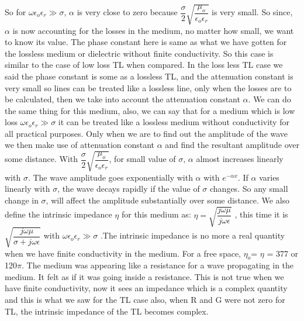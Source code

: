 So for $\omega\epsilon_{o}\epsilon_{r} \gg \sigma$, $\alpha$ is very close to zero because $\dfrac{\sigma}{2}\sqrt{\dfrac{\mu_{o}}{\epsilon_{o}\epsilon_{r}}}$ is very small. So since, $\alpha$ is now accounting for the losses in the medium, no matter how small, we want to know its value. The phase constant here is same as what we have gotten for the lossless medium or dielectric without finite conductivity. So this case is similar to the case of low loss TL when compared.
In the loss less TL case we said the phase constant is some as a lossless TL, and the attenuation constant is very small so lines can be treated like a lossless line, only when the losses are to be calculated, then we take into account the attenuation constant $\alpha$. We can do the same thing for this medium, also, we can say that for a medium which is low loss $\omega\epsilon_{o}\epsilon_{r} \gg \sigma$ it can be treated like a lossless medium without conductivity for all practical purposes. Only when we are to find out the amplitude of the wave we then make use of attenuation constant $\alpha$ and find the resultant amplitude over some distance. With $\dfrac{\sigma}{2}\sqrt{\dfrac{\mu_{o}}{\epsilon_{o}\epsilon_{r}}}$, for small value of $\sigma$, $\alpha$ almost increases linearly with $\sigma$. The wave amplitude goes exponentially with $\alpha$ with $e^{-\alpha x}$. If $\alpha$ varies linearly with $\sigma$, the wave decays rapidly if the value of $\sigma$ changes. So any small change in $\sigma$, will affect the amplitude substantially over some distance. 
We also define the intrinsic impedance $\eta$ for this medium as:
$\eta= \sqrt{\dfrac{j\omega\mu}{j\omega\epsilon}}$ , this time it is $\sqrt{\dfrac{j\omega\mu}{\sigma + j\omega\epsilon}}$ with $\omega\epsilon_{o}\epsilon_{r} \gg \sigma$ .The intrinsic impedance is no more a real quantity when we have finite conductivity in the medium. For a free space, $\eta_{o}$= $\eta$ = 377 or 120$\pi$. The medium was appearing like a resistance for a wave propagating in the medium. It felt as if it was going inside a resistance. This is not true when we have finite conductivity, now it sees an impedance which is a complex quantity and this is what we saw for the TL case also, when R and G were not zero for TL, the intrinsic impedance of the TL becomes complex.